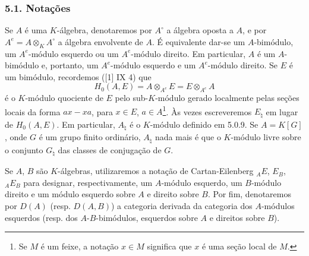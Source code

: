 \subsubsection*{5.1. Notações}

Se $A$ é uma $K$-álgebra, denotaremos por $A^\circ$ a álgebra oposta a $A$, e por $A^e=A\otimes_KA^\circ$ a álgebra envolvente de $A$. É equivalente dar-se um $A$-bimódulo, um $A^e$-módulo esquerdo ou um $A^e$-módulo direito. Em particular, $A$ é um $A$-bimódulo e, portanto, um $A^e$-módulo esquerdo e um $A^e$-módulo direito. Se $E$ é um bimódulo, recordemos ([1] IX 4) que
\[
H_0(A,E)=A\otimes_{A^e}E=E\otimes_{A^e}A
\]
é o $K$-módulo quociente de $E$ pelo sub-$K$-módulo gerado localmente pelas seções locais da forma $ax-xa$, para $x\in E$, $a\in A$\footnote{Se $M$ é um feixe, a notação $x\in M$ significa que $x$ é uma seção local de $M$.}. Às vezes escreveremos $E_\natural$ em lugar de $H_0(A,E)$. Em particular, $A_\natural$ é o $K$-módulo definido em 5.0.9. Se $A=K[G]$, onde $G$ é um grupo finito ordinário, $A_\natural$ nada mais é que o $K$-módulo livre sobre o conjunto $G_\natural$ das classes de conjugação de $G$.

Se $A$, $B$ são $K$-álgebras, utilizaremos a notação de Cartan-Eilenberg ${}_AE$, $E_B$, ${}_AE_B$ para designar, respectivamente, um $A$-módulo esquerdo, um $B$-módulo direito e um módulo esquerdo sobre $A$ e direito sobre $B$. Por fim, denotaremos por $D(A)$ (resp. $D(A,B)$) a categoria derivada da categoria dos $A$-módulos esquerdos (resp. dos $A$-$B$-bimódulos, esquerdos sobre $A$ e direitos sobre $B$).
